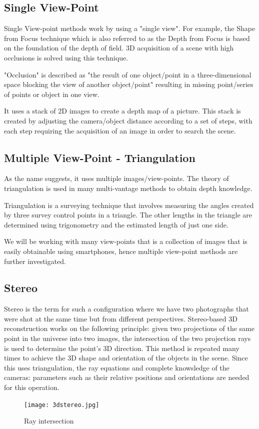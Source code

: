 \documentclass[a4paper]{report}
\begin{document}
\subsection{Single View-Point}

Single View-point methods work by using a "single view". For example, the Shape from Focus technique which is also referred to as the Depth from Focus is based on the foundation of the depth of field. 3D acquisition of a scene with high occlusions is solved using this technique.
\begin{center}
"Occlusion" is described as "the result of one object/point in a three-dimensional space blocking the view of another object/point" resulting in missing point/series of points or object in one view.
\end{center}

It uses a stack of 2D images to create a depth map of a picture. This stack is created by adjusting the camera/object distance according to a set of steps, with each step requiring the acquisition of an image in order to search the scene.
\\
\subsection{Multiple View-Point - Triangulation}
As the name suggests, it uses multiple images/view-points. The theory of triangulation is used in many multi-vantage methods to obtain depth knowledge.
\begin{center}
Triangulation is a surveying technique that involves measuring the angles created by three survey control points in a triangle. The other lengths in the triangle are determined using trigonometry and the estimated length of just one side.
\end{center}
We will be working with many view-points that is a collection of images that is easily obtainable using smartphones, hence multiple  view-point methods are further investigated.
\subsection{Stereo}
Stereo is the term for such a configuration where we have two photographs that were shot at the same time but from different perspectives. Stereo-based 3D reconstruction works on the following principle: given two projections of the same point in the universe into two images, the intersection of the two projection rays is used to determine the point's 3D direction. This method is repeated many times to achieve the 3D shape and orientation of the objects in the scene. Since this uses triangulation, the ray equations and complete knowsledge of the cameras: parameters such as their relative positions and orientations are needed for this operation.
\\
\begin{figure}[h]
\texttt{[image: 3dstereo.jpg]} 
\caption{Ray intersection}
\end{figure}
\newpage
\end{document}
